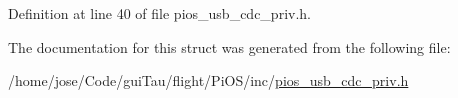 Definition at line 40 of file pios\-\_\-usb\-\_\-cdc\-\_\-priv.\-h.



The documentation for this struct was generated from the following file\-:\begin{DoxyCompactItemize}
\item 
/home/jose/\-Code/gui\-Tau/flight/\-Pi\-O\-S/inc/\hyperlink{pios__usb__cdc__priv_8h}{pios\-\_\-usb\-\_\-cdc\-\_\-priv.\-h}\end{DoxyCompactItemize}
